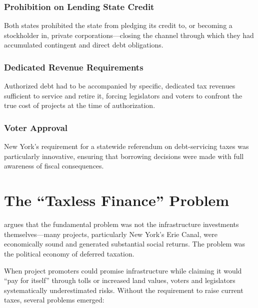 \documentclass[11pt]{article}
\begin{document}
\subsubsection*{Prohibition on Lending State Credit}
Both states prohibited the state from pledging its credit to, or becoming a
stockholder in, private corporations---closing the channel through which they
had accumulated contingent and direct debt obligations.

\subsubsection*{Dedicated Revenue Requirements}
Authorized debt had to be accompanied by specific, dedicated tax revenues
sufficient to service and retire it, forcing legislators and voters to confront
the true cost of projects at the time of authorization.

\subsubsection*{Voter Approval}
New York's requirement for a statewide referendum on debt-servicing taxes was
particularly innovative, ensuring that borrowing decisions were made with full
awareness of fiscal consequences.

\section{The ``Taxless Finance'' Problem}
\label{sec:taxless}

\citet{wallis2005constitutions} argues that the fundamental problem was not
the infrastructure investments themselves---many projects, particularly New
York's Erie Canal, were economically sound and generated substantial social
returns.  The problem was the political economy of deferred taxation.

When project promoters could promise infrastructure while claiming it would
``pay for itself'' through tolls or increased land values, voters and
legislators systematically underestimated risks.  Without the requirement to
raise current taxes, several problems emerged:
\end{document}
